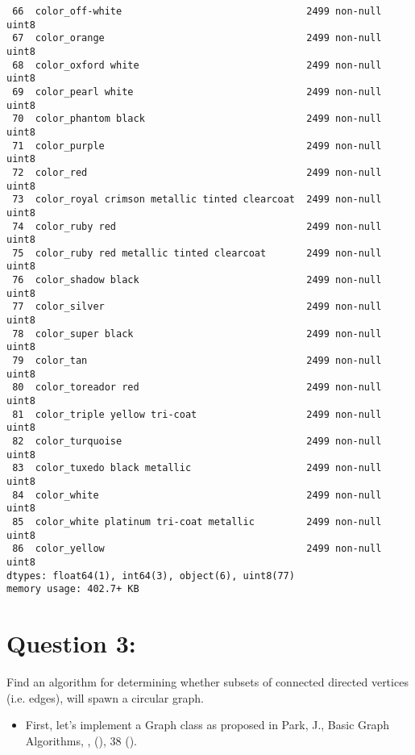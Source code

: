 \documentclass[11pt]{article}
\begin{document}
\begin{verbatim}
 66  color_off-white                                2499 non-null   uint8  
 67  color_orange                                   2499 non-null   uint8  
 68  color_oxford white                             2499 non-null   uint8  
 69  color_pearl white                              2499 non-null   uint8  
 70  color_phantom black                            2499 non-null   uint8  
 71  color_purple                                   2499 non-null   uint8  
 72  color_red                                      2499 non-null   uint8  
 73  color_royal crimson metallic tinted clearcoat  2499 non-null   uint8  
 74  color_ruby red                                 2499 non-null   uint8  
 75  color_ruby red metallic tinted clearcoat       2499 non-null   uint8  
 76  color_shadow black                             2499 non-null   uint8  
 77  color_silver                                   2499 non-null   uint8  
 78  color_super black                              2499 non-null   uint8  
 79  color_tan                                      2499 non-null   uint8  
 80  color_toreador red                             2499 non-null   uint8  
 81  color_triple yellow tri-coat                   2499 non-null   uint8  
 82  color_turquoise                                2499 non-null   uint8  
 83  color_tuxedo black metallic                    2499 non-null   uint8  
 84  color_white                                    2499 non-null   uint8  
 85  color_white platinum tri-coat metallic         2499 non-null   uint8  
 86  color_yellow                                   2499 non-null   uint8  
dtypes: float64(1), int64(3), object(6), uint8(77)
memory usage: 402.7+ KB
\end{verbatim}

\section{Question 3:}
\label{sec:org26d76b2}
Find an algorithm for determining whether subsets of connected directed vertices (i.e. edges), will 
spawn a circular graph.

\begin{itemize}
\item First, let's implement a Graph class as proposed in
\cite{parkBasicGraphAlgorithms} Park, J., Basic Graph Algorithms, , (), 38 ().
\end{itemize}
\end{document}
